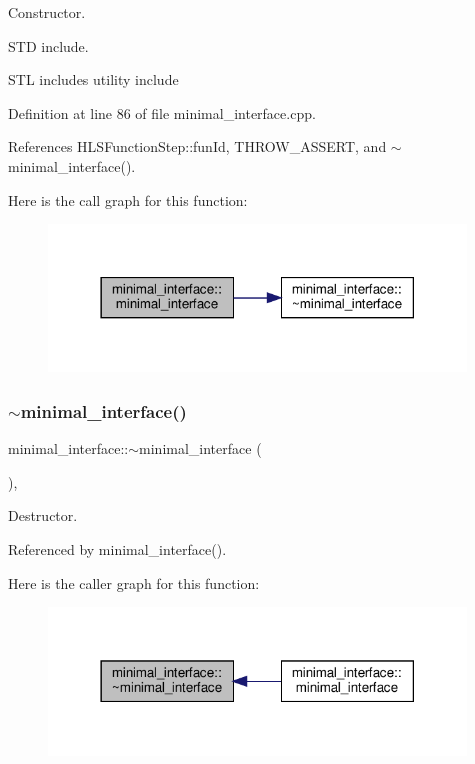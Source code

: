 Constructor. 

S\+TD include.

S\+TL includes utility include 

Definition at line 86 of file minimal\+\_\+interface.\+cpp.



References H\+L\+S\+Function\+Step\+::fun\+Id, T\+H\+R\+O\+W\+\_\+\+A\+S\+S\+E\+RT, and $\sim$minimal\+\_\+interface().

Here is the call graph for this function\+:
\nopagebreak
\begin{figure}[H]
\begin{center}
\leavevmode
\includegraphics[width=314pt]{dc/da7/classminimal__interface_aeceaa0bf5f7b0b4aa1d947d40ff60c77_cgraph}
\end{center}
\end{figure}
\mbox{\label{classminimal__interface_a756ca92a61ff2c289ef6c37a5db5adee}} 
\subsubsection{\texorpdfstring{$\sim$minimal\+\_\+interface()}{~minimal\_interface()}}
{\footnotesize\ttfamily minimal\+\_\+interface\+::$\sim$minimal\+\_\+interface (\begin{DoxyParamCaption}{ }\end{DoxyParamCaption})\hspace{0.3cm}{\ttfamily [override]}, {\ttfamily [default]}}



Destructor. 



Referenced by minimal\+\_\+interface().

Here is the caller graph for this function\+:
\nopagebreak
\begin{figure}[H]
\begin{center}
\leavevmode
\includegraphics[width=314pt]{dc/da7/classminimal__interface_a756ca92a61ff2c289ef6c37a5db5adee_icgraph}
\end{center}
\end{figure}


